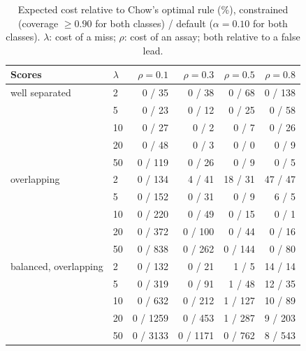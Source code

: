 \begin{table}[ht]
\centering
\caption{Expected cost relative to Chow's optimal rule (\%), constrained (coverage $\ge0.90$ for both classes) / default ($\alpha=0.10$ for both classes). $\lambda$: cost of a miss; $\rho$: cost of an assay; both relative to a false lead.}
\label{tab:cost}
\small
\begin{tabular}{llrrrr}
\toprule
Scores & $\lambda$ & $\rho=0.1$ & $\rho=0.3$ & $\rho=0.5$ & $\rho=0.8$ \\
\midrule
well separated & 2 & 0 / 35 & 0 / 38 & 0 / 68 & 0 / 138 \\
 & 5 & 0 / 23 & 0 / 12 & 0 / 25 & 0 / 58 \\
 & 10 & 0 / 27 & 0 / 2 & 0 / 7 & 0 / 26 \\
 & 20 & 0 / 48 & 0 / 3 & 0 / 0 & 0 / 9 \\
 & 50 & 0 / 119 & 0 / 26 & 0 / 9 & 0 / 5 \\
\midrule
overlapping & 2 & 0 / 134 & 4 / 41 & 18 / 31 & 47 / 47 \\
 & 5 & 0 / 152 & 0 / 31 & 0 / 9 & 6 / 5 \\
 & 10 & 0 / 220 & 0 / 49 & 0 / 15 & 0 / 1 \\
 & 20 & 0 / 372 & 0 / 100 & 0 / 44 & 0 / 16 \\
 & 50 & 0 / 838 & 0 / 262 & 0 / 144 & 0 / 80 \\
\midrule
balanced, overlapping & 2 & 0 / 132 & 0 / 21 & 1 / 5 & 14 / 14 \\
 & 5 & 0 / 319 & 0 / 91 & 1 / 48 & 12 / 35 \\
 & 10 & 0 / 632 & 0 / 212 & 1 / 127 & 10 / 89 \\
 & 20 & 0 / 1259 & 0 / 453 & 1 / 287 & 9 / 203 \\
 & 50 & 0 / 3133 & 0 / 1171 & 0 / 762 & 8 / 543 \\
\bottomrule
\end{tabular}
\end{table}